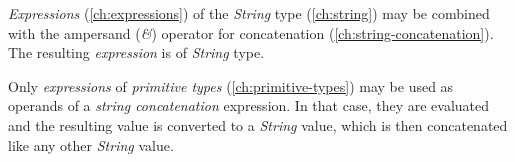 \emph{Expressions} (\ref{ch:expressions}) of the \emph{String} type (\ref{ch:string})
may be combined with the ampersand (\emph{\&}) operator
for concatenation (\ref{ch:string-concatenation}).
The resulting \emph{expression} is of \emph{String} type.

Only \emph{expressions} of \emph{primitive types} (\ref{ch:primitive-types})
may be used as operands of a \emph{string concatenation} expression.
In that case,
they are evaluated and the resulting value is converted to a \emph{String} value,
which is then concatenated like any other \emph{String} value.
